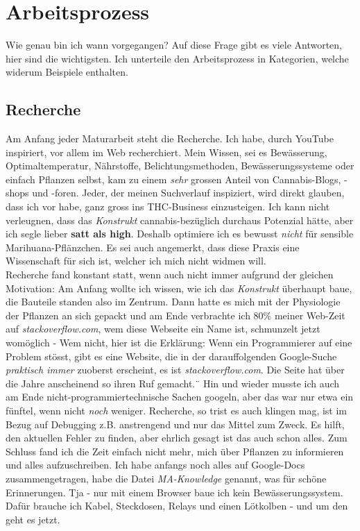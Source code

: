 \documentclass[12pt,titlepage,a4paper]{article}
\begin{document}
\section{Arbeitsprozess}
Wie genau bin ich wann vorgegangen? Auf diese Frage gibt es viele Antworten, hier sind die wichtigsten. Ich unterteile den Arbeitsprozess in Kategorien, welche widerum Beispiele enthalten.

\subsection{Recherche}
Am Anfang jeder Maturarbeit steht die Recherche. Ich habe, durch YouTube inspiriert, vor allem im Web recherchiert. Mein Wissen, sei es Bewässerung, Optimaltemperatur, Nährstoffe, Belichtungsmethoden, Bewässerungssysteme oder einfach Pflanzen selbst, kam zu einem \textit{sehr} grossen Anteil von Cannabis-Blogs, -shops und -foren. Jeder, der meinen Suchverlauf inspiziert, wird direkt glauben, dass ich vor habe, ganz gross ins THC-Business einzusteigen. Ich kann nicht verleugnen, dass das \textit{Konstrukt} cannabis-bezüglich durchaus Potenzial hätte, aber ich segle lieber \textbf{satt als high}. Deshalb optimiere ich es bewusst \textit{nicht} für sensible Marihuana-Pflänzchen. Es sei auch angemerkt, dass diese Praxis eine Wissenschaft für sich ist, welcher ich mich nicht widmen will. \\ Recherche fand konstant statt, wenn auch nicht immer aufgrund der gleichen Motivation: Am Anfang wollte ich wissen, wie ich das \textit{Konstrukt} überhaupt baue, die Bauteile standen also im Zentrum. Dann hatte es mich mit der Physiologie der Pflanzen an sich gepackt und am Ende verbrachte ich 80\% meiner Web-Zeit auf \textit{stackoverflow.com}, wem diese Webseite ein Name ist, schmunzelt jetzt womöglich - Wem nicht, hier ist die Erklärung: Wenn ein Programmierer auf eine Problem stösst, gibt es eine Website, die in der darauffolgenden Google-Suche \textit{praktisch immer} zuoberst erscheint, es ist \textit{stackoverflow.com}. Die Seite hat über die Jahre anscheinend so ihren Ruf gemacht.¨
Hin und wieder musste ich auch am Ende nicht-programmiertechnische Sachen googeln, aber das war nur etwa ein fünftel, wenn nicht \textit{noch} weniger. Recherche, so trist es auch klingen mag, ist im Bezug auf Debugging z.B. anstrengend und nur das Mittel zum Zweck. Es hilft, den aktuellen Fehler zu finden, aber ehrlich gesagt ist das auch schon alles. Zum Schluss fand ich die Zeit einfach nicht mehr, mich über Pflanzen zu informieren und alles aufzuschreiben. Ich habe anfangs noch alles auf Google-Docs zusammengetragen, habe die Datei \textit{MA-Knowledge} genannt, was für schöne Erinnerungen. Tja - nur mit einem Browser baue ich kein Bewässerungssystem. Dafür brauche ich Kabel, Steckdosen, Relays und einen Lötkolben - und um den geht es jetzt.
\end{document}
